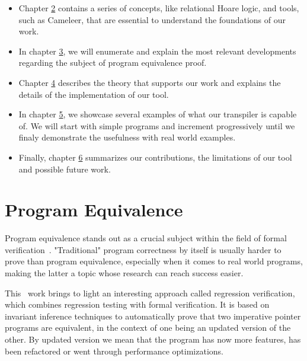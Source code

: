 \begin{itemize}
    \setlength\itemsep{0.1em}
    \item Chapter \hyperref[cha:background]{2} contains a series of concepts, like relational Hoare logic, and tools, such as Cameleer, that are essential to understand the foundations of our work.

    \item In chapter \hyperref[cha:state_of_the_art]{3}, we will enumerate and explain the most relevant developments regarding the subject of program equivalence proof.

    \item Chapter \hyperref[cha:methodology]{4} describes the theory that supports our work and explains the details of the implementation of our tool.

    \item In chapter \hyperref[cha:case_studies]{5}, we showcase several examples of what our transpiler is capable of. 
    We will start with simple programs and increment progressively until we finaly demonstrate the usefulness with real world examples.
    
    \item Finally, chapter \hyperref[cha:conclusion]{6} summarizes our contributions, the limitations of our tool and possible future work.

\end{itemize}




\iffalse
\section{Program Equivalence}
\label{sec:program_equivalence}

Program equivalence stands out as a crucial subject within the field of formal verification~\cite{DBLP:journals/fmsd/Strichman18}.
"Traditional" program correctness by itself is usually harder to prove than program equivalence, especially when it comes to real world programs, making the latter a topic whose research can reach success easier.

This~\cite{DBLP:journals/fmsd/KlebanovRU18} work brings to light an interesting approach called regression verification, which combines regression testing with formal verification.
It is based on invariant inference techniques to automatically prove that two imperative pointer programs are equivalent, in the context of one being an updated version of the other.
By updated version we mean that the program has now more features, has been refactored or went through performance optimizations.

